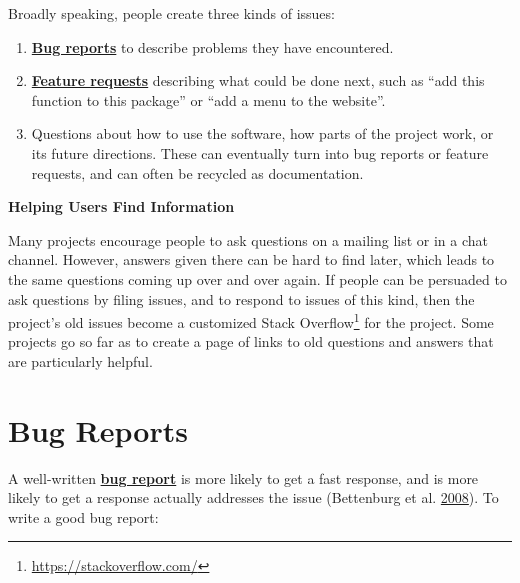\documentclass[
]{krantz}
\renewenvironment{quote}{\begin{VF}}{\end{VF}}
\renewcommand{\href}[2]{#2\footnote{\url{#1}}}
\newcommand{\gref}[2]{\hyperlink{#2}{\textbf{#1}}}
\begin{document}
Broadly speaking,
people create three kinds of issues:

\begin{enumerate}
\def\labelenumi{\arabic{enumi}.}
\item
  \gref{Bug reports}{bug\_report} to describe problems they have encountered.
\item
  \gref{Feature requests}{feature\_request}
  describing what could be done next,
  such as ``add this function to this package'' or ``add a menu to the website''.
\item
  Questions about how to use the software,
  how parts of the project work,
  or its future directions.
  These can eventually turn into bug reports or feature requests,
  and can often be recycled as documentation.
\end{enumerate}

\begin{quote}
\textbf{Helping Users Find Information}

Many projects encourage people to ask questions on a mailing list or in a chat channel.
However,
answers given there can be hard to find later,
which leads to the same questions coming up over and over again.
If people can be persuaded to ask questions by filing issues,
and to respond to issues of this kind,
then the project's old issues become a customized \href{https://stackoverflow.com/}{Stack Overflow} for the project.
Some projects go so far as to create a page of links
to old questions and answers that are particularly helpful.
\end{quote}

\hypertarget{teams-bugs}{%
\section{Bug Reports}\label{teams-bugs}}

A well-written \gref{bug report}{bug\_report} is more likely to get a fast response,
and is more likely to get a response actually addresses the issue (Bettenburg et al. \protect\hyperlink{ref-Bett2008}{2008}).
To write a good bug report:
\end{document}

